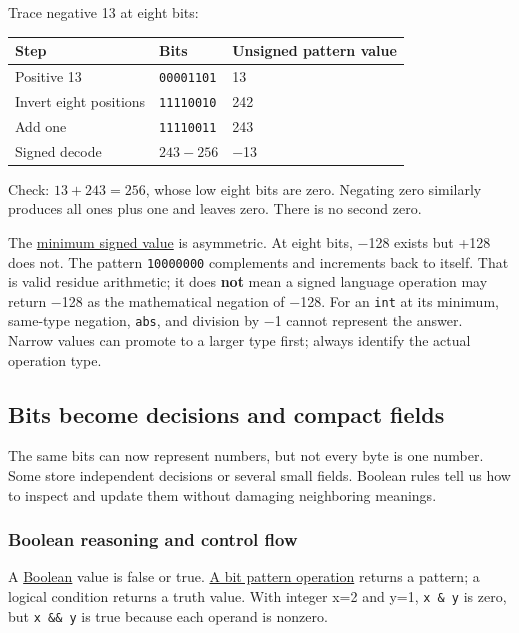 Trace negative 13 at eight bits:

{\def\LTcaptype{none} %
\begin{longtable}[]{@{}lll@{}}
\toprule\noalign{}
Step & Bits & Unsigned pattern value \\
\midrule\noalign{}
\endhead
\bottomrule\noalign{}
\endlastfoot
Positive 13 & \texttt{00001101} & 13 \\
Invert eight positions & \texttt{11110010} & 242 \\
Add one & \texttt{11110011} & 243 \\
Signed decode & \(243-256\) & −13 \\
\end{longtable}
}

Check: \(13+243=256\), whose low eight bits are zero. Negating zero similarly produces all ones plus one and leaves zero. There is no second zero.

The \hyperref[appendix-05f39b10364d]{minimum signed value} is asymmetric. At eight bits, −128 exists but +128 does not. The pattern \texttt{10000000} complements and increments back to itself. That is valid residue arithmetic; it does \textbf{not} mean a signed language operation may return −128 as the mathematical negation of −128. For an \texttt{int} at its minimum, same-type negation, \texttt{abs}, and division by −1 cannot represent the answer. Narrow values can promote to a larger type first; always identify the actual operation type.

\subsection{Bits become decisions and compact fields}\label{05-engine-i-ch001-bits-become-decisions-and-compact-fields}

The same bits can now represent numbers, but not every byte is one number. Some store independent decisions or several small fields. Boolean rules tell us how to inspect and update them without damaging neighboring meanings.

\subsubsection{Boolean reasoning and control flow}\label{05-engine-i-ch001-boolean-reasoning-and-control-flow}

A \hyperref[appendix-24475e1596a8]{Boolean} value is false or true. \hyperref[appendix-fe6b457d68d8]{A bit pattern operation} returns a pattern; a logical condition returns a truth value. With integer x=2 and y=1, \texttt{x\ \&\ y} is zero, but \texttt{x\ \&\&\ y} is true because each operand is nonzero.

